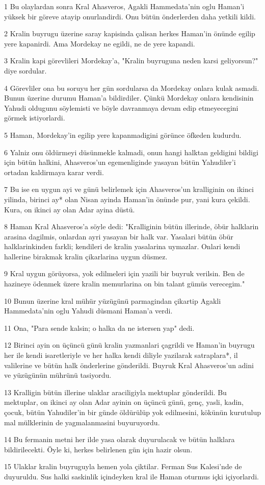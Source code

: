 \par 1 Bu olaylardan sonra Kral Ahasveros, Agakli Hammedata'nin oglu Haman'i yüksek bir göreve atayip onurlandirdi. Onu bütün önderlerden daha yetkili kildi.
\par 2 Kralin buyrugu üzerine saray kapisinda çalisan herkes Haman'in önünde egilip yere kapanirdi. Ama Mordekay ne egildi, ne de yere kapandi.
\par 3 Kralin kapi görevlileri Mordekay'a, "Kralin buyruguna neden karsi geliyorsun?" diye sordular.
\par 4 Görevliler ona bu soruyu her gün sordularsa da Mordekay onlara kulak asmadi. Bunun üzerine durumu Haman'a bildirdiler. Çünkü Mordekay onlara kendisinin Yahudi oldugunu söylemisti ve böyle davranmaya devam edip etmeyecegini görmek istiyorlardi.
\par 5 Haman, Mordekay'in egilip yere kapanmadigini görünce öfkeden kudurdu.
\par 6 Yalniz onu öldürmeyi düsünmekle kalmadi, onun hangi halktan geldigini bildigi için bütün halkini, Ahasveros'un egemenliginde yasayan bütün Yahudiler'i ortadan kaldirmaya karar verdi.
\par 7 Bu ise en uygun ayi ve günü belirlemek için Ahasveros'un kralliginin on ikinci yilinda, birinci ay* olan Nisan ayinda Haman'in önünde pur, yani kura çekildi. Kura, on ikinci ay olan Adar ayina düstü.
\par 8 Haman Kral Ahasveros'a söyle dedi: "Kralliginin bütün illerinde, öbür halklarin arasina dagilmis, onlardan ayri yasayan bir halk var. Yasalari bütün öbür halklarinkinden farkli; kendileri de kralin yasalarina uymazlar. Onlari kendi hallerine birakmak kralin çikarlarina uygun düsmez.
\par 9 Kral uygun görüyorsa, yok edilmeleri için yazili bir buyruk verilsin. Ben de hazineye ödenmek üzere kralin memurlarina on bin talant gümüs verecegim."
\par 10 Bunun üzerine kral mühür yüzügünü parmagindan çikartip Agakli Hammedata'nin oglu Yahudi düsmani Haman'a verdi.
\par 11 Ona, "Para sende kalsin; o halka da ne istersen yap" dedi.
\par 12 Birinci ayin on üçüncü günü kralin yazmanlari çagrildi ve Haman'in buyrugu her ile kendi isaretleriyle ve her halka kendi diliyle yazilarak satraplara*, il valilerine ve bütün halk önderlerine gönderildi. Buyruk Kral Ahasveros'un adini ve yüzügünün mührünü tasiyordu.
\par 13 Kralligin bütün illerine ulaklar araciligiyla mektuplar gönderildi. Bu mektuplar, on ikinci ay olan Adar ayinin on üçüncü günü, genç, yasli, kadin, çocuk, bütün Yahudiler'in bir günde öldürülüp yok edilmesini, kökünün kurutulup mal mülklerinin de yagmalanmasini buyuruyordu.
\par 14 Bu fermanin metni her ilde yasa olarak duyurulacak ve bütün halklara bildirilecekti. Öyle ki, herkes belirlenen gün için hazir olsun.
\par 15 Ulaklar kralin buyruguyla hemen yola çiktilar. Ferman Sus Kalesi'nde de duyuruldu. Sus halki saskinlik içindeyken kral ile Haman oturmus içki içiyorlardi.

